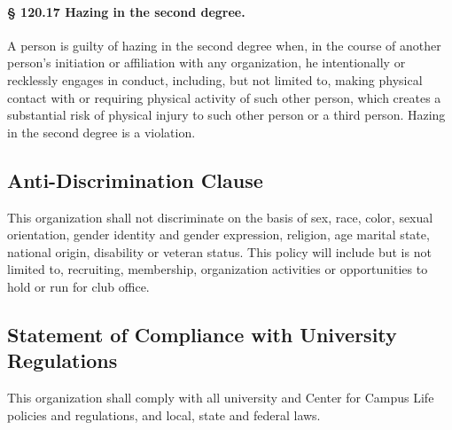 \documentclass{article}
\newcommand{\asection}[1]{\subsection{#1} \label{#1}}
\newcommand{\asubsubsection}[1]{\paragraph{#1} \label{#1}}
\begin{document}
\asubsubsection{§ 120.17 Hazing in the second degree.}
A person is guilty of hazing in the second degree when, in the course of another person's initiation or affiliation with any organization, he intentionally or recklessly engages in conduct, including, but not limited to, making physical contact with or requiring physical activity of such other person, which creates a substantial risk of physical injury to such other person or a third person.
Hazing in the second degree is a violation.

\asection{Anti-Discrimination Clause}
This organization shall not discriminate on the basis of sex, race, color, sexual orientation, gender identity and gender expression, religion, age marital state, national origin, disability or veteran status.
This policy will include but is not limited to, recruiting, membership, organization activities or opportunities to hold or run for club office.

\asection{Statement of Compliance with University Regulations}
This organization shall comply with all university and Center for Campus Life policies and regulations, and local, state and federal laws.
\end{document}
